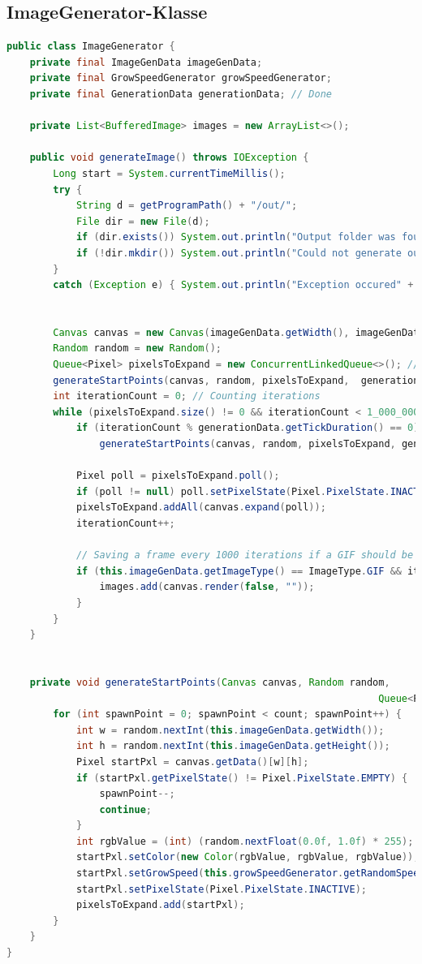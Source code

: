\documentclass[a4paper,10pt,ngerman]{scrartcl}
\begin{document}
\subsection{ImageGenerator-Klasse}
\begin{lstlisting}[language=Java]
public class ImageGenerator {
    private final ImageGenData imageGenData;
    private final GrowSpeedGenerator growSpeedGenerator;
    private final GenerationData generationData; // Done

    private List<BufferedImage> images = new ArrayList<>();

    public void generateImage() throws IOException {
        Long start = System.currentTimeMillis();
        try {
            String d = getProgramPath() + "/out/";
            File dir = new File(d);
            if (dir.exists()) System.out.println("Output folder was found");
            if (!dir.mkdir()) System.out.println("Could not generate output folder!");
        }
        catch (Exception e) { System.out.println("Exception occured" + e);}


        Canvas canvas = new Canvas(imageGenData.getWidth(), imageGenData.getHeight(), Color.BLACK);
        Random random = new Random();
        Queue<Pixel> pixelsToExpand = new ConcurrentLinkedQueue<>(); // Pixels that can grow
        generateStartPoints(canvas, random, pixelsToExpand,  generationData.getInitialSP());
        int iterationCount = 0; // Counting iterations
        while (pixelsToExpand.size() != 0 && iterationCount < 1_000_000) {
            if (iterationCount % generationData.getTickDuration() == 0) 
            	generateStartPoints(canvas, random, pixelsToExpand, generationData.getSPperTick());
            
            Pixel poll = pixelsToExpand.poll();
            if (poll != null) poll.setPixelState(Pixel.PixelState.INACTIVE);
            pixelsToExpand.addAll(canvas.expand(poll));
            iterationCount++;

            // Saving a frame every 1000 iterations if a GIF should be generated
            if (this.imageGenData.getImageType() == ImageType.GIF && iterationCount % 1000 == 0) {
                images.add(canvas.render(false, ""));
            }
        }
    }

    
    private void generateStartPoints(Canvas canvas, Random random, 
    															Queue<Pixel> pixelsToExpand, int count) {
        for (int spawnPoint = 0; spawnPoint < count; spawnPoint++) {
            int w = random.nextInt(this.imageGenData.getWidth());
            int h = random.nextInt(this.imageGenData.getHeight());
            Pixel startPxl = canvas.getData()[w][h];
            if (startPxl.getPixelState() != Pixel.PixelState.EMPTY) {
                spawnPoint--;
                continue;
            }
            int rgbValue = (int) (random.nextFloat(0.0f, 1.0f) * 255);
            startPxl.setColor(new Color(rgbValue, rgbValue, rgbValue));
            startPxl.setGrowSpeed(this.growSpeedGenerator.getRandomSpeed());
            startPxl.setPixelState(Pixel.PixelState.INACTIVE);
            pixelsToExpand.add(startPxl);
        }
    }
}
\end{lstlisting}
\end{document}
